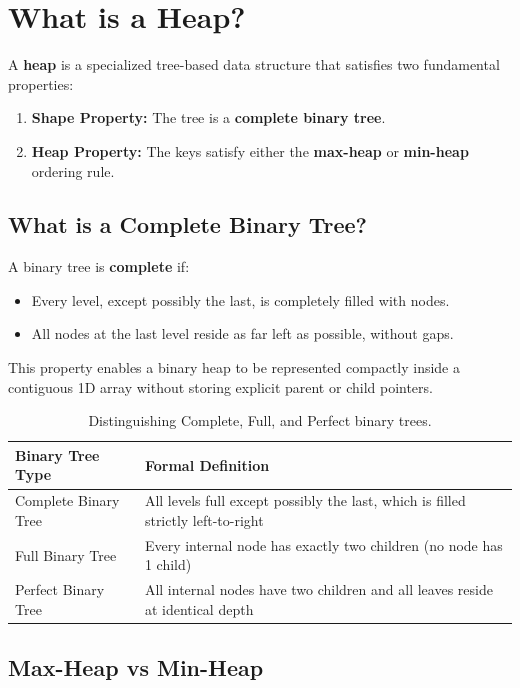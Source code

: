 \section{What is a Heap?}

A \textbf{heap} is a specialized tree-based data structure that satisfies two fundamental properties:
\begin{enumerate}
    \item \textbf{Shape Property:} The tree is a \textbf{complete binary tree}.
    \item \textbf{Heap Property:} The keys satisfy either the \textbf{max-heap} or \textbf{min-heap} ordering rule.
\end{enumerate}

\subsection{What is a Complete Binary Tree?}

A binary tree is \textbf{complete} if:
\begin{itemize}
    \item Every level, except possibly the last, is completely filled with nodes.
    \item All nodes at the last level reside as far left as possible, without gaps.
\end{itemize}

This property enables a binary heap to be represented compactly inside a contiguous 1D array without storing explicit parent or child pointers.

\begin{table}[htbp]
\centering
\small
\begin{tabularx}{\textwidth}{l X}
\toprule
\textbf{Binary Tree Type} & \textbf{Formal Definition} \\
\midrule
Complete Binary Tree & All levels full except possibly the last, which is filled strictly left-to-right \\
Full Binary Tree     & Every internal node has exactly two children (no node has 1 child) \\
Perfect Binary Tree  & All internal nodes have two children and all leaves reside at identical depth \\
\bottomrule
\end{tabularx}
\caption{Distinguishing Complete, Full, and Perfect binary trees.}
\end{table}

\subsection{Max-Heap vs Min-Heap}

